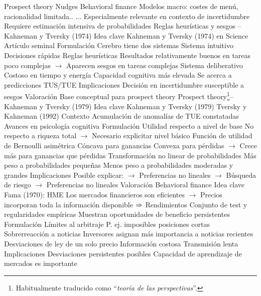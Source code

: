 \documentclass{nuevotema}
\begin{document}
\begin{esquemal}
				\4[] Prospect theory
				\4[] Nudges
				\4[] Behavioral finance
				\4[] Modelos macro: costes de menú, racionalidad limitada..
				\4[] ...
				\4 Especialmente relevante en contexto de incertidumbre
				\4[] Requiere estimación intensiva de probabilidades
		\2 Reglas heurísticas y sesgos -- Kahneman y Tversky (1974)
			\3 Idea clave
				\4 Kahneman y Tversky (1974) en Science
				\4 Artículo seminal
			\3 Formulación
				\4 Cerebro tiene dos sistemas
				\4 Sistema intuitivo
				\4[] Decisiones rápidas
				\4[] Reglas heurísticas
				\4[] Resultados relativamente buenos en tareas poco complejas
				\4[] $\to$ Aparecen sesgos en tareas complejas
				\4 Sistema deliberativo
				\4[] Costoso en tiempo y energía
				\4[] Capacidad cognitiva más elevada
				\4[] Se acerca a predicciones TUS/TUE
			\3 Implicaciones
				\4 Decisión en incertidumbre susceptible a sesgos
				\4
			\3 Valoración
				\4 Base conceptual para prospect theory
		\2 Prospect theory\footnote{Habitualmente traducido como ``\textit{teoría de las perspectivas}''.}-- Kahneman y Tversky (1979)
			\3 Idea clave
				\4 Kahneman y Tversky (1979)
				\4 Tversky y Kahneman (1992)
				\4 Contexto
				\4[] Acumulación de anomalías de TUE constatadas
				\4[] Avances en psicología cognitiva
			\3 Formulación
				\4 Utilidad respecto a nivel de base
				\4[] No respecto a riqueza total
				\4[] $\to$ Necesario explicitar nivel básico
				\4 Función de utilidad de Bernoulli asimétrica
				\4[] Cóncava para ganancias
				\4[] Convexa para pérdidas
				\4[] $\to$ Crece más para ganancias que pérdidas
				\4 Transformación no linear de probabilidades
				\4[] Más peso a probabilidades pequeñas
				\4[] Menos peso a probabilidades moderadas y grandes
			\3 Implicaciones
				\4 Posible explicar:
				\4[] $\to$ Preferencias no lineales
				\4[] $\to$ Búsqueda de riesgo
				\4[] $\to$ Preferencias no lineales
			\3 Valoración
		\2 Behavioral finance
			\3 Idea clave
				\4 Fama (1970): HME
				\4[] Los mercados financieros son eficientes
				\4[] $\to$ Precios incorporan toda la información disponible
				\4[] $\Rightarrow$ Rendimientos
				\4 Conjunto de test y regularidades empíricas
				\4[] Muestran oportunidades de beneficio persistentes
			\3 Formulación
				\4 Límites al arbitraje
				\4[] P. ej. imposibles posiciones cortas
				\4 Sobrerreacción a noticias
				\4[] Inversores asignan más importancia a noticias recientes
				\4 Desviaciones de ley de un solo precio
				\4[] Información costosa
				\4[] Transmisión lenta
			\3 Implicaciones
				\4 Desviaciones persistentes posibles
				\4 Capacidad de aprendizaje de mercados es importante

\end{esquemal}
\end{document}
